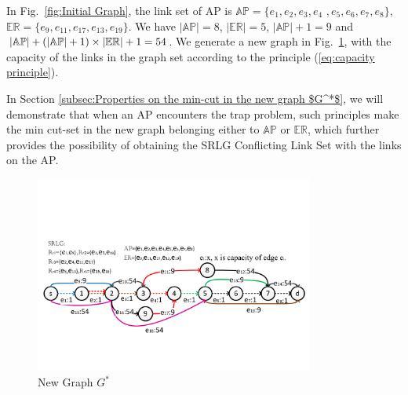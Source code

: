 In Fig.~\ref{fig:Initial Graph}, the link set of  AP is $\mathbb{AP}=\{e_1,e_2,e_3,e_4$
$,e_5,e_6,e_7,e_8\}$, $\mathbb{\mathbb{ER}}=\{e_9,e_{11},e_{17},e_{13},e_{19}\}$. We have $|\mathbb{AP}|=8$, $|\mathbb{\mathbb{ER}}|=5$, $|\mathbb{AP}|+1=9$ and ${\left| {{\rm{\mathbb{AP}}}} \right| + \left( {\left| {{\rm{\mathbb{AP}}}} \right| + 1} \right)\times \left| {{\rm{\mathbb{E}}}{{\rm{\mathbb{R}}}}} \right| + 1}=54$. We generate a new graph in Fig.~\ref{fig:FlowStarGraph}, with the capacity of the links in the graph set according to the principle (\ref{eq:capacity principle}).

In Section \ref{subsec:Properties on the min-cut in the new graph $G^*$}, we will demonstrate that when an AP encounters the trap problem, such principles make the min cut-set in the new graph  belonging either to $\mathbb{AP}$ or $\mathbb{\mathbb{ER}}$, which further provides the possibility of obtaining the SRLG Conflicting Link Set with the links on the AP.


\begin{figure}[tp]
  \centering
  \includegraphics[width=3.6in]{franz/FlowStarGraph}
  \caption{New Graph $G^*$}\label{fig:FlowStarGraph}
\end{figure}
